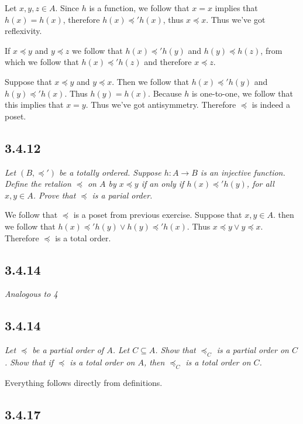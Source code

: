 \documentclass[11pt,oneside,titlepage]{book}
\begin{document}
Let $x, y, z \in A$. Since $h$ is a function, we follow that $x = x$ implies that $h(x) = h(x)$,
therefore $h(x) \preceq' h(x)$, thus $x \preceq x$. Thus we've got reflexivity.

If $x \preceq y$ and $y \preceq z$ we follow that $h(x) \preceq' h(y)$ and $h(y) \preceq h(z)$,
from which we follow that $h(x) \preceq' h(z)$ and therefore $x \preceq z$.

Suppose that $x \preceq y$ and $y \preceq x$. Then we follow that $h(x) \preceq' h(y)$
and $h(y) \preceq' h(x)$. Thus $h(y) = h(x)$. Because $h$ is one-to-one, we follow that
this implies that $x = y$. Thus we've got antisymmetry. Therefore $\preceq$ is indeed a poset.

\subsection*{3.4.12}

\textit{Let $(B, \preceq')$ be a totally ordered. Suppose $h: A \to B$ is an injective function.
  Define the retalion $\preceq$ on $A$ by $x \preceq y$ if an only if $h(x) \preceq' h(y)$,
  for all $x, y \in A$. Prove that $\preceq$ is a parial order.}

We follow that $\preceq$ is a poset from previous exercise. Suppose that $x, y \in A$.
then we follow that $h(x) \preceq' h(y) \lor h(y) \preceq' h(x)$. Thus
$x \preceq y \lor y \preceq x$. Therefore $\preceq$ is a total order.

\subsection*{3.4.14}

\textit{Analogous to 4}

\subsection*{3.4.14}

\textit{Let $\preceq$ be a partial order of $A$. Let $C \subseteq A$. Show that
  $\preceq_C$ is a partial order on $C$. Show that if $\preceq$ is a total order on $A$,
  then $\preceq_C$ is a total order on $C$.}

Everything follows directly from definitions.

\subsection*{3.4.17}
\end{document}
